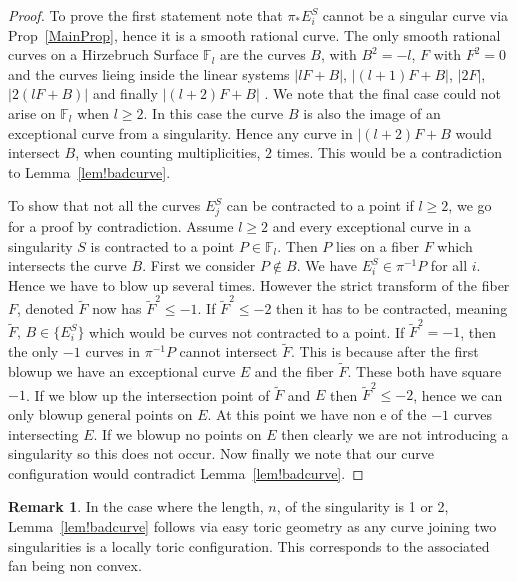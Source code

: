 \documentclass[11pt]{amsbook}
\theoremstyle{definition}
\theoremstyle{definition}
\theoremstyle{definition}
\theoremstyle{definition}
\theoremstyle{definition}
\theoremstyle{definition}
\theoremstyle{definition}
\theoremstyle{definition}
\newtheorem*{rem}{Remark}
\newcommand{\mb}[1]{\mathbb{#1}}
\newcommand{\wt}[1]{\widetilde #1}
\begin{document}
\begin{proof}
To prove the first statement note that $\pi_* E_i^S$ cannot be a singular curve via Prop~\ref{MainProp}, hence it is a smooth rational curve. The only smooth rational curves on a Hirzebruch Surface $\mb{F}_l$ are the curves $B$, with $B^2 = -l$, $F$ with $F^2 = 0$ and the curves lieing inside the linear systems $|lF + B|$,  $|(l+1)F + B|$, $|2F|$, $|2(lF+B)|$  and finally $|(l+2)F + B|$ . We note that the final case could not arise on $\mb{F}_l$ when $l \ge 2$.  In this case the curve $B$ is also the image of an exceptional curve from a singularity. Hence any curve in $|(l+2)F + B$ would intersect $B$, when counting multiplicities, $2$ times. This would be a contradiction to Lemma~\ref{lem!badcurve}.



To show that not all the curves $E_j^S$ can be contracted to a point if $l \geq 2$, we go for a proof by contradiction. Assume $l \ge 2$ and every exceptional curve in a singularity $S$ is contracted to a point $P \in \mb{F}_l$. Then $P$ lies on a fiber $F$ which intersects the curve $B$. First we consider $P \not\in B$. We have $E_i^S \in \pi^{-1}{P}$ for all $i$. Hence we have to blow up several times. However the strict transform of the fiber $F$, denoted $\wt{F}$ now has $\wt{F}^2 \leq -1$. If $\wt{F}^2 \leq -2$ then it has to be contracted, meaning $\wt{F}, \, B \in \{ E_i^S \}$ which would be curves not contracted to a point. If $\wt{F}^2 = -1$, then the only $-1 $ curves in $\pi^{-1}{P}$ cannot intersect $\wt{F}$. This is because after the first blowup we have an exceptional curve $E$ and the fiber $\wt{F}$. These both have square $-1$. If we blow up the intersection point of $\wt{F}$ and $E$ then $\wt{F}^2 \leq -2$, hence we can only blowup general points on $E$. At this point we have non e of the $-1$ curves intersecting $E$. If we blowup no points on $E$ then clearly we are not introducing a singularity so this does not occur. Now finally we note that our curve configuration would contradict Lemma~\ref{lem!badcurve}. 

\end{proof}

\begin{rem}
In the case where the length, $n$, of the singularity is 1 or 2, Lemma~\ref{lem!badcurve} follows via easy toric geometry as any curve joining two singularities is a locally toric configuration. This corresponds to the associated fan being non convex. 
\end{rem}
\end{document}
